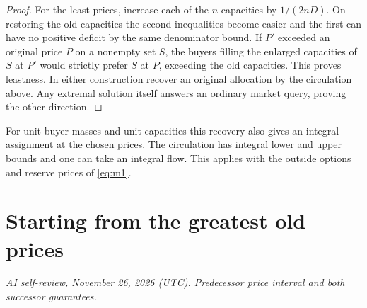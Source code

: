 \documentclass[11pt,oneside,openany,notitlepage]{report}
\newcommand{\reviewdate}{November 26, 2026 (UTC)}
\newcommand{\reviewmark}[1]{\par\nopagebreak[4]\noindent
  {\footnotesize\itshape AI self-review, \reviewdate. #1\par}\nobreak\smallskip}
\begin{document}
\begin{proof}
For the least prices, increase each of the \(n\) capacities by \(1/(2nD)\).
On restoring the old capacities the second inequalities become easier
and the first can have no positive deficit by the same denominator bound.
If \(P'\) exceeded an original price \(P\) on a nonempty set \(S\),
the buyers filling the enlarged capacities of \(S\) at \(P'\) would
strictly prefer \(S\) at \(P\), exceeding the old capacities. This proves
leastness. In either construction recover an original allocation by the
circulation above. Any extremal solution itself answers an ordinary market
query, proving the other direction.
\end{proof}

For unit buyer masses and unit capacities this recovery also gives an
integral assignment at the chosen prices. The circulation has integral
lower and upper bounds and one can take an integral flow. This applies
with the outside options and reserve prices of \eqref{eq:m1}.

\section{Starting from the greatest old prices}
\reviewmark{Predecessor price interval and both successor guarantees.}
\end{document}
